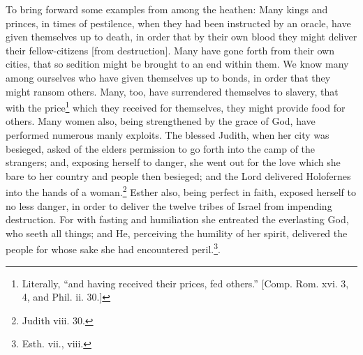 To bring forward some examples from among the heathen: Many kings and princes, in times of pestilence, when they had been instructed by an oracle, have given themselves up to death, in order that by their own blood they might deliver their fellow-citizens [from destruction]. Many have gone forth from their own cities, that so sedition might be brought to an end within  them. We know many among ourselves who have given themselves up to bonds, in order that they might ransom others. Many, too, have surrendered themselves to slavery, that with the price\footnote{Literally, “and having received their prices, fed others.” [Comp. Rom. xvi. 3, 4, and Phil. ii. 30.]} which they received for themselves, they might provide food for others. Many women also, being strengthened by the grace of God, have performed numerous manly exploits. The blessed Judith, when her city was besieged, asked of the elders permission to go forth into the camp of the strangers; and, exposing herself to danger, she went out for the love which she bare to her country and people then besieged; and the Lord delivered Holofernes into the hands of a woman.\footnote{Judith viii. 30.} Esther also, being perfect in faith, exposed herself to no less danger, in order to deliver the twelve tribes of Israel from impending destruction. For with fasting and humiliation she entreated the everlasting God, who seeth all things; and He, perceiving the humility of her spirit, delivered the people for whose sake she had encountered peril.\footnote{Esth. vii., viii.}.


